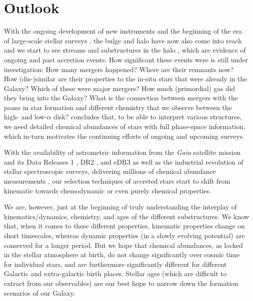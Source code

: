 \documentclass[fleqn,usenatbib]{mnras}
\newcommand{\Gaia}{\textit{Gaia}\xspace} %
\begin{document}
\section{Outlook} \label{sec:Outlook}

With the ongoing development of new instruments and the beginning of the era of large-scale stellar surveys \citep[see][for reviews]{Nissen2018, Jofre2019}, the bulge and halo have now also come into reach and we start to see streams and substructures in the halo \citep[see e.g.][for a review]{Helmi2020}, which are evidence of ongoing and past accretion events. How significant these events were is still under investigation: How many mergers happened? Where are their remnants now? How (dis-)similar are their properties to the in-situ stars that were already in the Galaxy? Which of these were major mergers? How much (primordial) gas did they bring into the Galaxy? What is the connection between mergers with the pause in star formation and different chemistry that we observe between the high- and low-$\alpha$ disk? \citet{Helmi2020} concludes that, to be able to interpret various structures, we need detailed chemical abundances of stars with full phase-space information, which in-turn motivates the continuing efforts of ongoing and upcoming surveys.

With the availability of astrometric information from the \Gaia satellite mission and its Data Releases 1 \citep{Brown2016}, DR2 \citep{Brown2018}, and eDR3 \citep{Brown2021} as well as the industrial revolution of stellar spectroscopic surveys, delivering millions of chemical abundance measurements \cite[for a review see][]{Jofre2019}, our selection techniques of accreted stars start to shift from kinematic towards chemodynamic or even purely chemical properties.

We are, however, just at the beginning of truly understanding the interplay of kinematics/dynamics, chemistry, and ages of the different substructures. We know that, when it comes to these different properties, kinematic properties change on short timescales, whereas dynamic properties (in a slowly evolving potential) are conserved for a longer period. But we hope that chemical abundances, as locked in the stellar atmosphere at birth, do not change significantly over cosmic time for individual stars, and are furthermore significantly different for different Galactic and extra-galactic birth places. Stellar ages (which are difficult to extract from our observables) are our best hope to narrow down the formation scenarios of our Galaxy.
\end{document}
